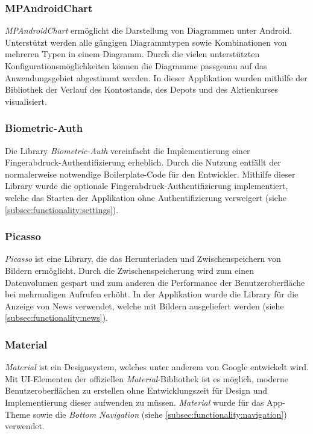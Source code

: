 \documentclass[a4paper]{article}
\begin{document}
\subsubsection{MPAndroidChart}
\label{subsubsec:technologies:bibs:mpandroidchart}
\textit{MPAndroidChart} \autocite{mpandroidchart} ermöglicht die Darstellung von Diagrammen unter Android. Unterstützt werden alle gängigen Diagrammtypen sowie Kombinationen von mehreren Typen in einem Diagramm. Durch die vielen unterstützten Konfigurationsmöglichkeiten können die Diagramme passgenau auf das Anwendungsgebiet abgestimmt werden. In dieser Applikation wurden mithilfe der Bibliothek der Verlauf des Kontostands, des Depots und des Aktienkurses visualisiert.


\subsubsection{Biometric-Auth}
\label{subsubsec:technologies:bibs:biometricauth}
Die Library \textit{Biometric-Auth} \autocite{biometricauth} vereinfacht die Implementierung einer Finger\-abdruck-Authentifizierung erheblich. Durch die Nutzung entfällt der normalerweise notwendige Boilerplate-Code für den Entwickler. Mithilfe dieser Library wurde die optionale Fingerabdruck-Authentifizierung implementiert, welche das Starten der Applikation ohne Authentifizierung verweigert (siehe \autoref{subsec:functionality:settings}).


\subsubsection{Picasso}
\label{subsubsec:technologies:bibs:picasso}
\textit{Picasso} \autocite{picasso} ist eine Library, die das Herunterladen und Zwischenspeichern von Bildern ermöglicht. Durch die Zwischenspeicherung wird zum einen Datenvolumen gespart und zum anderen die Performance der Benutzeroberfläche bei mehrmaligen Aufrufen erhöht. In der Applikation wurde die Library für die Anzeige von News verwendet, welche mit Bildern ausgeliefert werden (siehe \autoref{subsec:functionality:news}).


\subsubsection{Material}
\label{subsubsec:technologies:bibs:material}
\textit{Material} ist ein Designsystem, welches unter anderem von Google entwickelt wird.
Mit UI-Elementen der offiziellen \textit{Material}-Bibliothek ist es möglich, moderne Benutzeroberflächen zu erstellen ohne Entwicklungszeit für Design und Implementierung dieser aufwenden zu müssen.
\textit{Material} wurde für das App-Theme sowie die \textit{Bottom Navigation} (siehe \autoref{subsec:functionality:navigation}) verwendet.
\end{document}
